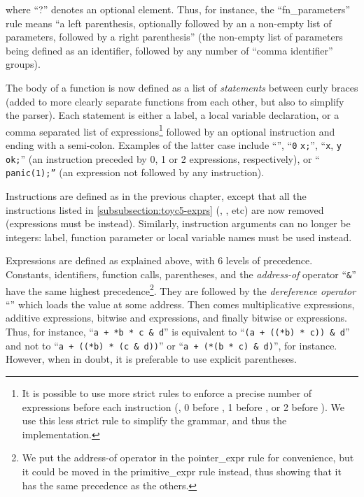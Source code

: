 \noindent where ``?'' denotes an optional element. Thus, for instance, the
``fn\_parameters'' rule means ``a left parenthesis, optionally followed by an a
non-empty list of parameters, followed by a right parenthesis'' (the non-empty
list of parameters being defined as an identifier, followed by any number of
``comma identifier'' groups).

The body of a function is now defined as a list of {\em statements} between
curly braces (added to more clearly separate functions from each other, but
also to simplify the parser). Each statement is either a label, a local
variable declaration, or a comma separated list of expressions\footnote{It is
possible to use more strict rules to enforce a precise number of expressions
before each instruction (\eg, 0 before , 1 before , or 2
before ). We use this less strict rule to simplify the grammar, and
thus the implementation.} followed by an optional instruction and ending with a
semi-colon. Examples of the latter case include ``'', ``{\tt 0}
 {\tt x}{\tt ;}'', ``{\tt x}, {\tt y}  {\tt ok}{\tt ;}''
(an instruction preceded by 0, 1 or 2 expressions, respectively), or ``{\tt
panic(1){\tt ;}''} (an expression not followed by any instruction).

Instructions are defined as in the previous chapter, except that all the
instructions listed in \cref{subsubsection:toyc5-exprs} (,
, etc) are now removed (expressions must be instead). Similarly,
instruction arguments can no longer be integers: label, function parameter or
local variable names must be used instead.

Expressions are defined as explained above, with 6 levels of precedence.
Constants, identifiers, function calls, parentheses, and the {\em address-of}
operator ``{\tt \&}'' have the same highest precedence\footnote{We put the
address-of operator in the pointer\_expr rule for convenience, but it could be
moved in the primitive\_expr rule instead, thus showing that it has the same
precedence as the others.}. They are followed by the {\em dereference operator}
``{\tt *}'' which loads the value at some address. Then comes multiplicative
expressions, additive expressions, bitwise and expressions, and finally bitwise
or expressions. Thus, for instance, ``{\tt a + *b * c \& d}'' is equivalent to
``{\tt (a + ((*b) * c)) \& d}'' and not to ``{\tt a + ((*b) * (c \& d))}'' or
``{\tt a + (*(b * c) \& d)}'', for instance. However, when in doubt, it is
preferable to use explicit parentheses.

